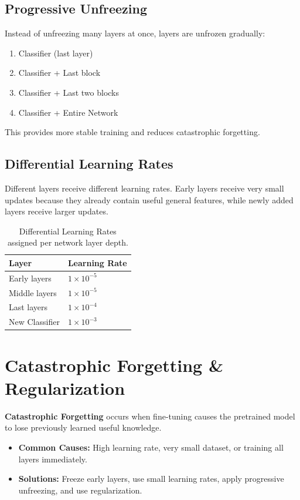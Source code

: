 \subsection{Progressive Unfreezing}
Instead of unfreezing many layers at once, layers are unfrozen gradually:
\begin{enumerate}
    \item Classifier (last layer)
    \item Classifier + Last block
    \item Classifier + Last two blocks
    \item Classifier + Entire Network
\end{enumerate}
This provides more stable training and reduces catastrophic forgetting.

\subsection{Differential Learning Rates}
Different layers receive different learning rates. Early layers receive very small updates because they already contain useful general features, while newly added layers receive larger updates.

\begin{table}[htbp]
\centering
\begin{tabular}{l | l}
\hline
\textbf{Layer} & \textbf{Learning Rate} \\
\hline
Early layers & $1 \times 10^{-5}$ \\
Middle layers & $1 \times 10^{-5}$ \\
Last layers & $1 \times 10^{-4}$ \\
New Classifier & $1 \times 10^{-3}$ \\
\hline
\end{tabular}
\caption{Differential Learning Rates assigned per network layer depth.}
\end{table}

\section{Catastrophic Forgetting \& Regularization}

\textbf{Catastrophic Forgetting} occurs when fine-tuning causes the pretrained model to lose previously learned useful knowledge.

\begin{itemize}
    \item \textbf{Common Causes:} High learning rate, very small dataset, or training all layers immediately.
    \item \textbf{Solutions:} Freeze early layers, use small learning rates, apply progressive unfreezing, and use regularization.
\end{itemize}

